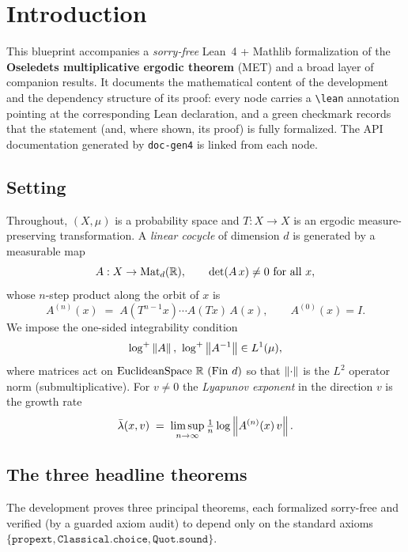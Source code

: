\chapter{Introduction}

This blueprint accompanies a \emph{sorry-free} Lean~4 + Mathlib formalization of the
\textbf{Oseledets multiplicative ergodic theorem} (MET) and a broad layer of companion
results. It documents the mathematical content of the development and the dependency
structure of its proof: every node carries a \texttt{\textbackslash lean} annotation pointing at the
corresponding Lean declaration, and a green checkmark records that the statement (and,
where shown, its proof) is fully formalized. The API documentation generated by
\texttt{doc-gen4} is linked from each node.

\section{Setting}

Throughout, \((X, \mu)\) is a probability space and \(T : X \to X\) is an ergodic
measure-preserving transformation. A \emph{linear cocycle} of dimension \(d\) is generated
by a measurable map
\[
  A : X \to \mathrm{Mat}_{d}(\mathbb{R}), \qquad \det(A\,x) \neq 0 \text{ for all } x,
\]
whose \(n\)-step product along the orbit of \(x\) is
\[
  A^{(n)}(x) \;=\; A(T^{n-1}x)\cdots A(Tx)\,A(x), \qquad A^{(0)}(x) = I .
\]
We impose the one-sided integrability condition
\[
  \log^{+}\left\lVert A \right\rVert, \ \log^{+}\left\lVert A^{-1} \right\rVert \in L^{1}(\mu),
\]
where matrices act on \(\mathrm{EuclideanSpace}\ \R\ (\mathrm{Fin}\ d)\) so that
\(\left\lVert \cdot \right\rVert\) is the \(L^2\) operator norm (submultiplicative). For \(v \neq 0\) the
\emph{Lyapunov exponent} in the direction \(v\) is the growth rate
\[
  \bar\lambda(x, v) \;=\; \limsup_{n\to\infty} \tfrac1n \log \left\lVert A^{(n)}(x)\, v \right\rVert.
\]

\section{The three headline theorems}

The development proves three principal theorems, each formalized sorry-free and verified
(by a guarded axiom audit) to depend only on the standard axioms
\(\{\texttt{propext}, \texttt{Classical.choice}, \texttt{Quot.sound}\}\).

